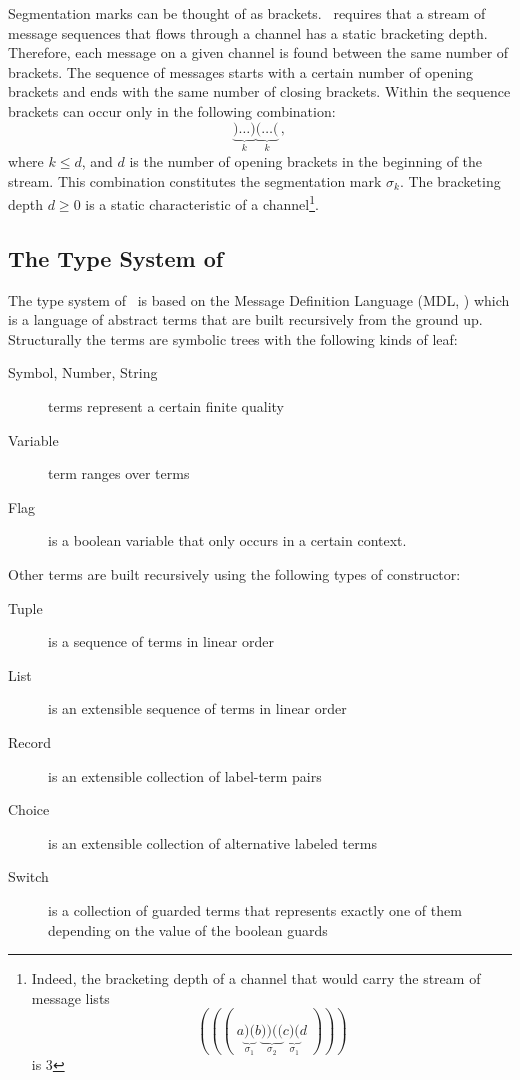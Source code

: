 Segmentation marks can be thought of as brackets. \ak\ requires that a stream of message sequences that flows through a channel has a static bracketing depth. Therefore, each message on a given channel is found between the same number of brackets. The sequence of messages starts with a certain number of opening brackets and ends with the same number of closing brackets. Within the sequence brackets can occur only in the following combination:
\[
\underbrace{)\ldots)}_k \underbrace{(\ldots(}_k\,,
\]
where $k \le d$, and $d$ is the number of opening brackets in the beginning of the stream. This combination constitutes the segmentation mark $\sigma_k$. The bracketing depth $d \ge 0$ is a static characteristic of a channel\footnote{Indeed, the bracketing depth of a channel that would carry the stream of message lists
\[
(((\;a\underbrace{)(}_{\sigma_1}b\underbrace{))((}_{\sigma_2}c\underbrace{)(}_{\sigma_1}d\;)))
\]
is 3}.

    \subsection*{The Type System of \ak\ }
The type system of \ak\ is based on the Message Definition Language (MDL, \cite{astrakahn}) which is a language of abstract terms that are built recursively from the ground up. Structurally the terms are symbolic trees with the following kinds of leaf:
\begin{description}
\item[Symbol, Number, String] terms represent a certain finite quality
\item[Variable] term ranges over terms
\item[Flag] is a boolean variable that only occurs in a certain context.
\end{description}
Other terms are built recursively using the following types of constructor:
\begin{description}
\item[Tuple] is a sequence of terms in linear order
\item[List] is an extensible sequence of terms in linear order
\item[Record] is an extensible collection of label-term pairs
\item[Choice] is an extensible collection of alternative labeled terms
\item[Switch] is a collection of guarded terms that represents exactly one of them depending on the value of the boolean guards
\end{description}

